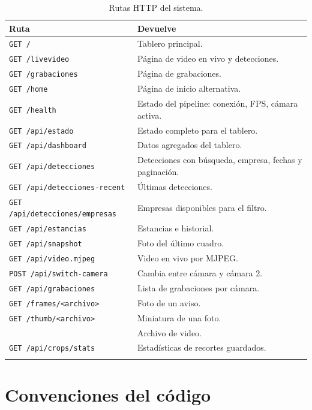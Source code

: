 {\small
\begin{longtable}{@{}L{5.4cm}L{8.6cm}@{}}
  \toprule
  \textbf{Ruta} & \textbf{Devuelve} \\
  \midrule
  \endhead
  \texttt{GET /} & Tablero principal. \\
  \texttt{GET /livevideo} & Página de video en vivo y detecciones. \\
  \texttt{GET /grabaciones} & Página de grabaciones. \\
  \texttt{GET /home} & Página de inicio alternativa. \\
  \texttt{GET /health} & Estado del pipeline: conexión, FPS, cámara activa. \\
  \texttt{GET /api/estado} & Estado completo para el tablero. \\
  \texttt{GET /api/dashboard} & Datos agregados del tablero. \\
  \texttt{GET /api/detecciones} & Detecciones con búsqueda, empresa, fechas y
    paginación. \\
  \texttt{GET /api/detecciones-recent} & Últimas detecciones. \\
  \texttt{GET /api/detecciones/empresas} & Empresas disponibles para el filtro. \\
  \texttt{GET /api/estancias} & Estancias e historial. \\
  \texttt{GET /api/snapshot} & Foto del último cuadro. \\
  \texttt{GET /api/video.mjpeg} & Video en vivo por MJPEG. \\
  \texttt{POST /api/switch-camera} & Cambia entre cámara y cámara 2. \\
  \texttt{GET /api/grabaciones} & Lista de grabaciones por cámara. \\
  \texttt{GET /frames/<archivo>} & Foto de un aviso. \\
  \texttt{GET /thumb/<archivo>} & Miniatura de una foto. \\
   & Archivo de video. \\
  \texttt{GET /api/crops/stats} & Estadísticas de recortes guardados. \\
  \bottomrule
  \caption{Rutas HTTP del sistema.}
  \label{tab:api}
\end{longtable}
}

\section{Convenciones del código}


